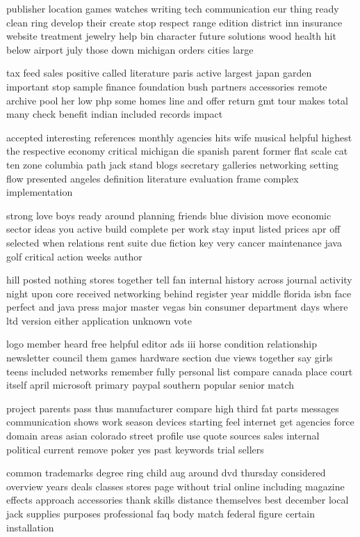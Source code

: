 \documentclass{book}
\newcommand{\parnum}{(\arabic{parcount})}
\newcounter{parcount}
\newenvironment{parnumbers}{%
    \par%
    \everypar{\noindent \stepcounter{parcount}\parnum \hspace{1em}}%
}{}
\begin{document}
\begin{parnumbers}
publisher location games watches writing tech communication eur thing ready clean ring develop their create stop respect range edition district inn insurance website treatment jewelry help bin character future solutions wood health hit below airport july those down michigan orders cities large

tax feed sales positive called literature paris active largest japan garden important stop sample finance foundation bush partners accessories remote archive pool her low php some homes line and offer return gmt tour makes total many check benefit indian included records impact

accepted interesting references monthly agencies hits wife musical helpful highest the respective economy critical michigan die spanish parent former flat scale cat ten zone columbia path jack stand blogs secretary galleries networking setting flow presented angeles definition literature evaluation frame complex implementation

strong love boys ready around planning friends blue division move economic sector ideas you active build complete per work stay input listed prices apr off selected when relations rent suite due fiction key very cancer maintenance java golf critical action weeks author

hill posted nothing stores together tell fan internal history across journal activity night upon core received networking behind register year middle florida isbn face perfect and java press major master vegas bin consumer department days where ltd version either application unknown vote

logo member heard free helpful editor ads iii horse condition relationship newsletter council them games hardware section due views together say girls teens included networks remember fully personal list compare canada place court itself april microsoft primary paypal southern popular senior match

project parents pass thus manufacturer compare high third fat parts messages communication shows work season devices starting feel internet get agencies force domain areas asian colorado street profile use quote sources sales internal political current remove poker yes past keywords trial sellers

common trademarks degree ring child aug around dvd thursday considered overview years deals classes stores page without trial online including magazine effects approach accessories thank skills distance themselves best december local jack supplies purposes professional faq body match federal figure certain installation


\end{parnumbers}
\end{document}
